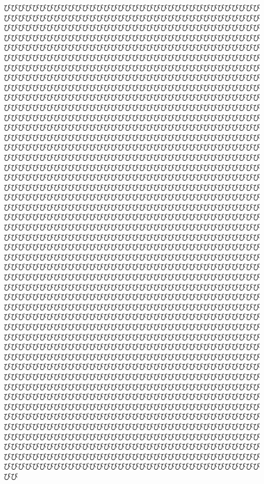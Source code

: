 \documentclass[a4paper, 9pt]{article}
\begin{document}
びびびびびびびびびびびびびびびびびびびびびびびびびびびびびびびびびびびびびびびびびびびびびびびびびびびびびびびびびびびびびびびびびびびびびびびびびびびびびびびびびびびびびびびびびびびびびびびびびびびびびびびびびびびびびびびびびびびびびびびびびびびびびびびびびびびびびびびびびびびびびびびびびびびびびびびびびびびびびびびびびびびびびびびびびびびびびびびびびびびびびびびびびびびびびびびびびびびびびびびびびびびびびびびびびびびびびびびびびびびびびびびびびびびびびびびびびびびびびびびびびびびびびびびびびびびびびびびびびびびびびびびびびびびびびびびびびびびびびびびびびびびびびびびびびびびびびびびびびびびびびびびびびびびびびびびびびびびびびびびびびびびびびびびびびびびびびびびびびびびびびびびびびびびびびびびびびびびびびびびびびびびびびびびびびびびびびびびびびびびびびびびびびびびびびびびびびびびびびびびびびびびびびびびびびびびびびびびびびびびびびびびびびびびびびびびびびびびびびびびびびびびびびびびびびびびびびびびびびびびびびびびびびびびびびびびびびびびびびびびびびびびびびびびびびびびびびびびびびびびびびびびびびびびびびびびびびびびびびびびびびびびびびびびびびびびびびびびびびびびびびびびびびびびびびびびびびびびびびびびびびびびびびびびびびびびびびびびびびびびびびびびびびびびびびびびびびびびびびびびびびびびびびびびびびびびびびびびびびびびびびびびびびびびびびびびびびびびびびびびびびびびびびびびびびびびびびびびびびびびびびびびびびびびびびびびびびびびびびびびびびびびびびびびびびびびびびびびびびびびびびびびびびびびびびびびびびびびびびびびびびびびびびびびびびびびびびびびびびびびびびびびびびびびびびびびびびびびびびびびびびびびびびびびびびびびびびびびびびびびびびびびびびびびびびびびびびびびびびびびびびびびびびびびびびびびびびびびびびびびびびびびびびびびびびびびびびびびびびびびびびびびびびびびびびびびびびびびびびびびびびびびびびびびびびびびびびびびびびびびびびびびびびびびびびびびびびびびびびびびびびびびびびびびびびびびびびびびびびびびびびびびびびびびびびびびびびびびびびびびびびびびびびびびびびびびびびびびびびびびびびびびびびびびびびびびびびびびびびびびびびびびびびびびびびびびびびびびびびびびびびびびびびびびびびびびびびびびびびびびびびびびびびびびびびびびびびびびびびびびびびびびびびびびびびびびびびびびびびびびびびびびびびびびびびびびびびびびびびびびびびびびびびびびびびびびびびびびびびびびびびびびびびびびびびびびびびびびびびびびびびびびびびびびびびびびびびびびびびびびびびびびびびびびびびびびびびびびびびびびびびびびびびびびびびびびびびびびびびびびびびびびびびびびびびびびびびびびびびびびびびびびびびびびびびびびびびびびびびびびびびびびびびびびびびびびびびびびびびびびびびびびびびびびびびびびびびびびびびびびびびびびびびびびびびびびびびびびびびびびびびびびびびびびびびびびびびびびびびびびびびびびびびびびびびびびびびびびびびびびびびびびびびびびびびびびびびびびびびびびびびびびびびびびびびびびびびびびびびびびびびびびびびびびびびびびびびびびびびびびびびびびびびびびびびびびびびびびびびびびびびびびびびびびびびびびびびびびびびびびびびびびびびびびびびびびびびびびびびびびびびびびびびびびびびびびびびびびびびびびびびびびびびびびびびびびびびびびびびびびびびびびびびびびびびびびびびびびびびびびびびびびびびびびびびびびびびびびびびびびびびびびびびびびびびびびびびびびびびびびびびびびびびびびびびびびびびびびびびびびびびびびびびびびびびびびびびびびびびびびびびびびびびびびびびびびびびびびびびびびびびびびびびびびびびびびびびびびびびびびびびびびびびびびびびびびびびびびびびびびびびびびびびびびびびびびびびびびびびびびびびびびびびびびびびびびびびびびびびびびびびびびびびびびびびびびびびび







\end{document}
